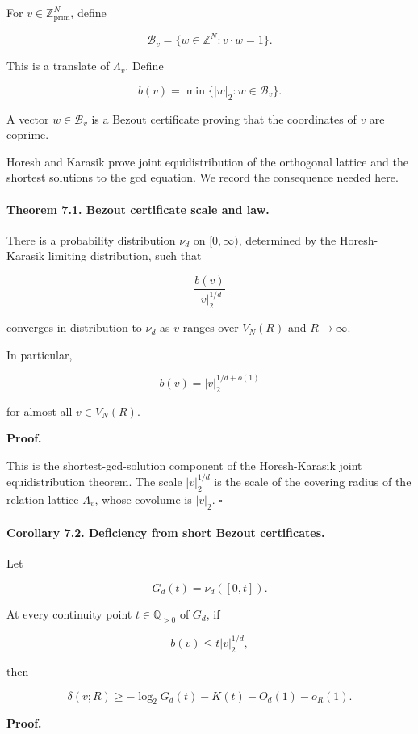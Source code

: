 \documentclass[11pt]{article}
\begin{document}
For $v\in\mathbb Z^N_{\mathrm{prim}}$, define

\[
\mathcal B_v=\{w\in\mathbb Z^N:v\cdot w=1\}.
\]

This is a translate of $\Lambda_v$. Define

\[
b(v)=\min\{|w|_2:w\in\mathcal B_v\}.
\]

A vector $w\in\mathcal B_v$ is a Bezout certificate proving that the coordinates of $v$ are coprime.

Horesh and Karasik prove joint equidistribution of the orthogonal lattice and the shortest solutions to the gcd equation. We record the consequence needed here.

\paragraph{Theorem 7.1. Bezout certificate scale and law.}

There is a probability distribution $\nu_d$ on $[0,\infty)$, determined by the Horesh-Karasik limiting distribution, such that

\[
\frac{b(v)}{|v|_2^{1/d}}
\]

converges in distribution to $\nu_d$ as $v$ ranges over $V_N(R)$ and $R\to\infty$.

In particular,

\[
b(v)=|v|_2^{1/d+o(1)}
\]

for almost all $v\in V_N(R)$.

\noindent\textbf{Proof.}

This is the shortest-gcd-solution component of the Horesh-Karasik joint equidistribution theorem. The scale $|v|_2^{1/d}$ is the scale of the covering radius of the relation lattice $\Lambda_v$, whose covolume is $|v|_2$. $\square$

\paragraph{Corollary 7.2. Deficiency from short Bezout certificates.}

Let

\[
G_d(t)=\nu_d([0,t]).
\]

At every continuity point $t\in\mathbb Q_{>0}$ of $G_d$, if

\[
b(v)\le t|v|_2^{1/d},
\]

then

\[
\delta(v;R)
\ge
-\log_2G_d(t)-K(t)-O_d(1)-o_R(1).
\]

\noindent\textbf{Proof.}
\end{document}
